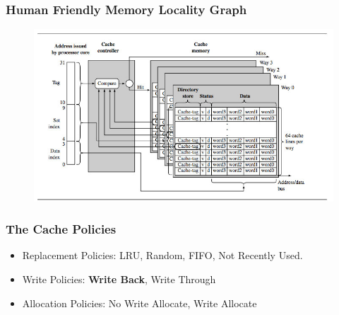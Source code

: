 \documentclass{beamer}
\begin{document}

\begin{frame}[plain]
	\frametitle{Human Friendly Memory Locality Graph}
		\begin{figure}
			\includegraphics[width=1\linewidth]{img/cacheinternals.jpg}
		\end{figure}
\end{frame}


\begin{frame}
	\frametitle{The Cache Policies}
	\begin{itemize}
		\item Replacement Policies: LRU, Random, FIFO, Not Recently Used. 
		\item Write Policies: \textbf{Write Back}, Write Through
		\item Allocation Policies: No Write Allocate, Write Allocate
	\end{itemize}

\end{frame}

\end{document}
